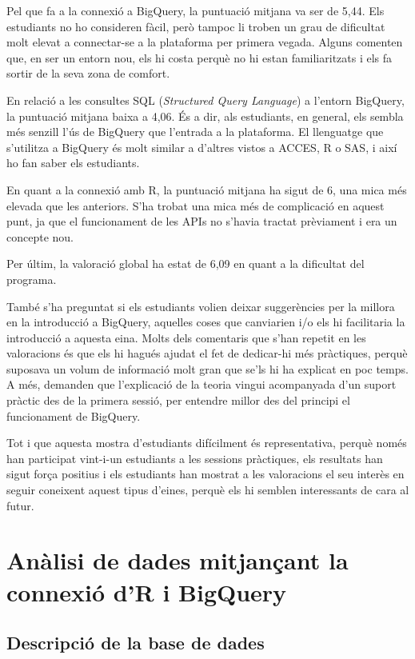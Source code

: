 \documentclass[12pt,longbibliography]{article}
\theoremstyle{definition}
\theoremstyle{remark}
\begin{document}
Pel que fa a la connexió a BigQuery, la puntuació mitjana va ser de 5,44. Els estudiants no ho consideren fàcil, però tampoc li troben un grau de dificultat molt elevat a connectar-se a la plataforma per primera vegada. Alguns comenten que, en ser un entorn nou, els hi costa perquè no hi estan familiaritzats i els fa sortir de la seva zona de comfort.


En relació a les consultes SQL (\textit{Structured Query Language}) a l'entorn BigQuery, la puntuació mitjana baixa a 4,06. És a dir, als estudiants, en general, els sembla més senzill l'ús de BigQuery que l'entrada a la plataforma. El llenguatge que s'utilitza a BigQuery és molt similar a d'altres vistos a ACCES, R o SAS, i així ho fan saber els estudiants.


En quant a la connexió amb R, la puntuació mitjana ha sigut de 6, una mica més elevada que les anteriors. S'ha trobat una mica més de complicació en aquest punt, ja que el funcionament de les APIs no s'havia tractat prèviament i era un concepte nou.


Per últim, la valoració global ha estat de 6,09 en quant a la dificultat del programa.


També s'ha preguntat si els estudiants volien deixar suggerències per la millora en la introducció a BigQuery, aquelles coses que canviarien i/o els hi facilitaria la introducció a aquesta eina. Molts dels comentaris que s'han repetit en les valoracions és que els hi hagués ajudat el fet de dedicar-hi més pràctiques, perquè suposava un volum de informació molt gran que se'ls hi ha explicat en poc temps. A més, demanden que l'explicació de la teoria vingui acompanyada d'un suport pràctic des de la primera sessió, per entendre millor des del principi el funcionament de BigQuery.


Tot i que aquesta mostra d'estudiants difícilment és representativa, perquè només han participat vint-i-un estudiants a les sessions pràctiques, els resultats han sigut força positius i els estudiants han mostrat a les valoracions el seu interès en seguir coneixent aquest tipus d'eines, perquè els hi semblen interessants de cara al futur.


\newpage


\section{Anàlisi de dades mitjançant la connexió d'R i BigQuery}

\subsection{Descripció de la base de dades}
\end{document}
